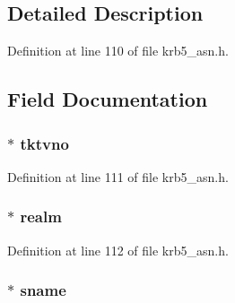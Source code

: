 \subsection{Detailed Description}


Definition at line 110 of file krb5\+\_\+asn.\+h.



\subsection{Field Documentation}
\subsubsection[{\texorpdfstring{tktvno}{tktvno}}]{ $\ast$ tktvno}\hypertarget{structkrb5__tktbody__st_aebc63820b33bd4aaaaefb18a47298e58}{}\label{structkrb5__tktbody__st_aebc63820b33bd4aaaaefb18a47298e58}


Definition at line 111 of file krb5\+\_\+asn.\+h.

\subsubsection[{\texorpdfstring{realm}{realm}}]{ $\ast$ realm}\hypertarget{structkrb5__tktbody__st_affebdb30e43ecd6dcf7fb03b5cb89f2d}{}\label{structkrb5__tktbody__st_affebdb30e43ecd6dcf7fb03b5cb89f2d}


Definition at line 112 of file krb5\+\_\+asn.\+h.

\subsubsection[{\texorpdfstring{sname}{sname}}]{ $\ast$ sname}\hypertarget{structkrb5__tktbody__st_a471bc8ab962e6788697e0b1a99a90114}{}\label{structkrb5__tktbody__st_a471bc8ab962e6788697e0b1a99a90114}


